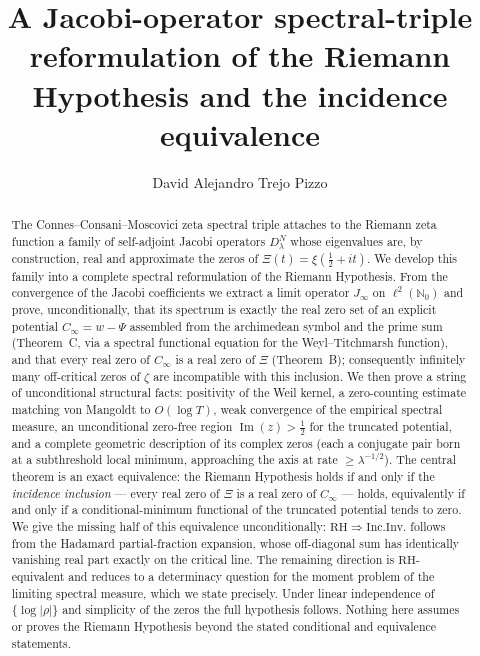 \documentclass[11pt]{amsart}
\title[A Jacobi-Operator Reformulation]{A Jacobi-operator spectral-triple reformulation of the Riemann Hypothesis
and the incidence equivalence}
\author{David Alejandro Trejo Pizzo}
\theoremstyle{definition}
\theoremstyle{remark}
\newcommand{\RH}{\mathrm{RH}}
\renewcommand{\Im}{\operatorname{Im}}
\newcommand{\half}{\tfrac12}
\newcommand{\Cinf}{C_\infty}
\newcommand{\Jinf}{J_\infty}
\begin{document}
\nocite{bgConnes99,bgCC21,bgBK,bgSimon}
\begin{abstract}
The Connes--Consani--Moscovici zeta spectral triple attaches to the Riemann zeta function a
family of self-adjoint Jacobi operators $D_\lambda^N$ whose eigenvalues are, by construction,
real and approximate the zeros of $\Xi(t)=\xi(\half+it)$. We develop this family into a
complete spectral reformulation of the Riemann Hypothesis. From the convergence of the
Jacobi coefficients we extract a limit operator $\Jinf$ on $\ell^2(\mathbb N_0)$ and prove,
unconditionally, that its spectrum is exactly the real zero set of an explicit potential
$\Cinf=w-\Psi$ assembled from the archimedean symbol and the prime sum (Theorem~C, via a
spectral functional equation for the Weyl--Titchmarsh function), and that every real zero of
$\Cinf$ is a real zero of $\Xi$ (Theorem~B); consequently infinitely many off-critical zeros
of $\zeta$ are incompatible with this inclusion. We then prove a string of unconditional
structural facts: positivity of the Weil kernel, a zero-counting estimate matching von
Mangoldt to $O(\log T)$, weak convergence of the empirical spectral measure, an unconditional
zero-free region $\Im(z)>\half$ for the truncated potential, and a complete geometric
description of its complex zeros (each a conjugate pair born at a subthreshold local minimum,
approaching the axis at rate $\ge\lambda^{-1/2}$). The central theorem is an exact
equivalence: the Riemann Hypothesis holds if and only if the \emph{incidence inclusion} ---
every real zero of $\Xi$ is a real zero of $\Cinf$ --- holds, equivalently if and only if a
conditional-minimum functional of the truncated potential tends to zero. We give the missing
half of this equivalence unconditionally: $\RH\Rightarrow\mathrm{Inc.Inv.}$ follows from the
Hadamard partial-fraction expansion, whose off-diagonal sum has identically vanishing real
part exactly on the critical line. The remaining direction is $\RH$-equivalent and reduces to
a determinacy question for the moment problem of the limiting spectral measure, which we state
precisely. Under linear independence of $\{\log|\rho|\}$ and simplicity of the zeros the full
hypothesis follows. Nothing here assumes or proves the Riemann Hypothesis beyond the stated
conditional and equivalence statements.
\end{abstract}
\maketitle

\tableofcontents
\newpage
\end{document}
